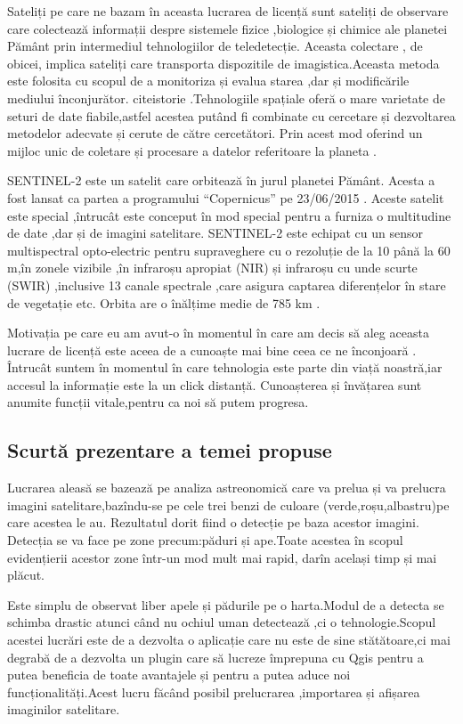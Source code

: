 \documentclass[12pt,a4paper]{article}
\theoremstyle{definition}
\theoremstyle{remark}
\begin{document}
Sateliți pe care ne bazam în aceasta lucrarea de licență sunt sateliți de observare care  colectează   informații despre sistemele fizice ,biologice și chimice ale planetei Pământ prin intermediul tehnologiilor de teledetecție. Aceasta colectare , de obicei, implica sateliți care transporta dispozitile de imagistica.Aceasta metoda este folosita cu scopul de a monitoriza și evalua starea ,dar și modificările mediului înconjurător. cite{istorie} \cite{istorie2}.Tehnologiile spațiale oferă o mare varietate de seturi de date fiabile,astfel acestea putând fi combinate cu cercetare și dezvoltarea metodelor adecvate și cerute de către cercetători. Prin acest mod oferind un mijloc unic de coletare și procesare a datelor referitoare la planeta \cite{wikisputnik}.

SENTINEL-2 este un satelit care orbitează în jurul planetei Pământ. Acesta a fost lansat ca partea a programului “Copernicus” pe 23/06/2015 . Aceste satelit este special ,întrucât este conceput în mod special pentru a furniza o multitudine de date ,dar și de imagini satelitare. SENTINEL-2 este echipat cu un sensor multispectral opto-electric pentru supraveghere cu o rezoluție de la 10 până la 60 m,în zonele vizibile ,în infraroșu apropiat (NIR) și infraroșu cu unde scurte (SWIR) ,inclusive 13 canale spectrale ,care asigura captarea diferențelor în stare de vegetație etc. Orbita are o înălțime medie de 785 km \cite{wiki}.


Motivația pe care eu am avut-o în momentul în care am decis să aleg aceasta lucrare de licență este aceea de a cunoaște mai bine ceea ce ne înconjoară . Întrucât suntem în momentul în care tehnologia este parte din viață noastră,iar accesul la informație este la un click distanță. Cunoașterea și învățarea sunt anumite funcții vitale,pentru ca noi să putem progresa. 
 

\subsection{{Scurt\u a prezentare a temei propuse}}

Lucrarea aleasă se bazează pe analiza astreonomică care va prelua și va prelucra imagini satelitare,bazîndu-se pe cele trei benzi de culoare (verde,roșu,albastru)pe care  acestea le au. Rezultatul dorit fiind o detecție pe baza acestor imagini. Detecția se va face pe zone precum:păduri și ape.Toate acestea în scopul evidențierii acestor zone într-un mod mult mai rapid, darîn același timp și mai plăcut.


Este simplu de observat liber apele și pădurile pe o harta.Modul de a detecta se schimba drastic atunci când nu ochiul uman detectează ,ci o tehnologie.Scopul acestei lucrări este de a dezvolta o aplicație care nu este de sine stătătoare,ci mai degrabă de a dezvolta un plugin care să lucreze împrepuna cu Qgis pentru a putea beneficia de toate avantajele și pentru a putea aduce noi funcționalități.Acest lucru făcând posibil prelucrarea ,importarea și afișarea imaginilor satelitare.
\end{document}
